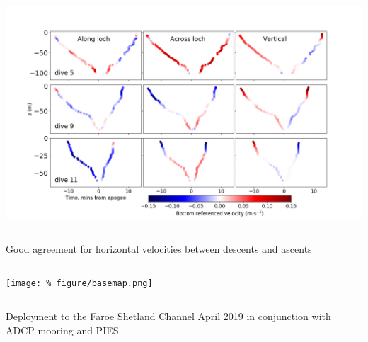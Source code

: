 \documentclass[unknownkeysallowed,usepdftitle=false]{beamer}
\newcommand{\secvariable}{nothing}
\newcommand{\mysection}[1]{\renewcommand{\secvariable}{#1}
}
\begin{document}
\begin{frame}\label{3_dives}
\vspace*{-1.2mm}    
\begin{center}
\includegraphics[trim=0 0 0 50,clip,width=\paperwidth]{figure/diveclimb_vel9.png}
\end{center}

\vspace*{-5.2mm}
\begin{columns}
\begin{column}[t]{0.9\textwidth}
Good agreement for horizontal velocities between descents and ascents
\end{column}
\end{columns}



  
\end{frame}



\mysection{plan}
\begin{frame}\label{\secvariable} %
\vspace{-0.3cm}
\begin{center}
\texttt{[image: \%
figure/basemap.png]}
\end{center}
\begin{columns}
\begin{column}[t]{0.9\textwidth}
Deployment to the Faroe Shetland Channel April 2019 in conjunction with ADCP mooring and PIES \hyperlink{fsc_shear}{}
\end{column}
\end{columns}
\end{frame}
\end{document}

